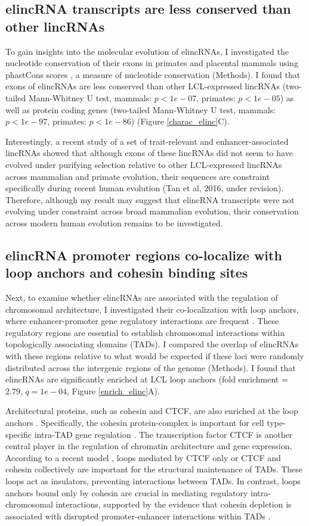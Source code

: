 \documentclass[11pt,a4paper]{report}
\begin{document}
\subsection*{elincRNA transcripts are less conserved than other lincRNAs}

To gain insights into the molecular evolution of elincRNAs, I investigated the nucleotide conservation of their exons in primates and placental mammals using phastCons scores \cite{Siepel2005}⁠, a measure of nucleotide conservation (Methods). I found that exons of elincRNAs are less conserved than other LCL-expressed lincRNAs (two-tailed Mann-Whitney U test, mammals: $p<1e-07$, primates: $p<1e-05$) as well as  protein coding genes (two-tailed Mann-Whitney U test, mammals: $p<1e-97$, primates: $p<1e-86$) (Figure \ref{charac_elinc}C). 

Interestingly, a recent study of a set of trait-relevant and enhancer-associated lincRNAs showed that although exons of these lincRNAs did not seem to have evolved under purifying selection relative to other LCL-expressed lincRNAs across mammalian and primate evolution, their sequences are constraint specifically during recent human evolution (Tan et al, 2016, under revision). Therefore, although my result may suggest that elincRNA transcripts were not evolving under constraint across broad mammalian evolution, their conservation across modern human evolution remains to be investigated.

\subsection*{elincRNA promoter regions co-localize with loop anchors and cohesin binding sites}

Next, to examine whether elincRNAs are associated with the regulation of chromosomal architecture, I investigated their co-localization with loop anchors, where enhancer-promoter gene regulatory interactions are frequent \cite{Ji2016}. These regulatory regions are essential to establish chromosomal interactions within topologically associating domains (TADs). I compared the overlap of elincRNAs with these regions relative to what would be expected if these loci were randomly distributed across the intergenic regions of the genome (Methods). I found that elincRNAs are significantly enriched at LCL loop anchors (fold enrichment = 2.79, $q=1e-04$, Figure \ref{enrich_elinc}A).


Architectural proteins, such as cohesin and CTCF, are also enriched at the loop anchors \cite{Rao2014}⁠. Specifically, the cohesin protein-complex is important for cell type-specific intra-TAD gene regulation \cite{Hadjur2009}⁠. The transcription factor CTCF is another central player in the regulation of chromatin architecture and gene expression. According to a recent model \cite{Ji2016}⁠, loops mediated by CTCF only or CTCF and cohesin collectively are important for the structural maintenance of TADs. These loops act as insulators, preventing interactions between TADs. In contrast, loops anchors bound only by cohesin are crucial in mediating regulatory intra-chromosomal interactions, supported by the evidence that cohesin depletion is associated with disrupted promoter-enhancer interactions within TADs \cite{Seitan2013}⁠.
\end{document}
